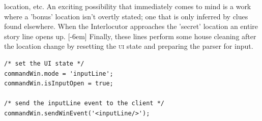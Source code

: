 location, etc. An exciting possibility that immediately comes to mind is a work
where a 'bonus' location isn't overtly stated; one that is only inferred by clues
found elsewhere. When the Interlocutor approaches the 'secret' location an
entire story line opens up.
[-6em]
Finally, these lines perform some house cleaning after the location change by
resetting the \textsc{ui} state and preparing the parser for input.
\begin{lstlisting}
/* set the UI state */
commandWin.mode = 'inputLine';
commandWin.isInputOpen = true;

/* send the inputLine event to the client */
commandWin.sendWinEvent('<inputLine/>');
\end{lstlisting}
